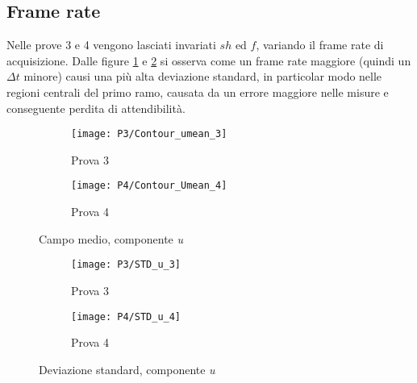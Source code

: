 \documentclass{article} %
\begin{document}
\subsection{Frame rate}
Nelle prove 3 e 4 vengono lasciati invariati $sh$ ed $f$, variando il frame rate di acquisizione. Dalle figure \ref{fig:cm_p3-1} e \ref{fig:cm_p4} si osserva come un frame rate maggiore (quindi un $\Delta t$ minore) causi una più alta deviazione standard, in particolar modo nelle regioni centrali del primo ramo, causata da un errore maggiore nelle misure e conseguente perdita di attendibilità.\par
\begin{figure}[ht!]
	\centering
	\begin{subfigure}{0.3\textwidth}
		\texttt{[image: P3/Contour\_umean\_3]}
		\caption{Prova 3}
		\label{fig:cm_p3-1}
	\end{subfigure} \quad
	\begin{subfigure}{0.3\textwidth}
		\texttt{[image: P4/Contour\_Umean\_4]}
		\caption{Prova 4}
		\label{fig:cm_p4}
	\end{subfigure}
	\caption{Campo medio, componente \textit{u}}
	\label{fig:cm_p34}
\end{figure}
\begin{figure}[!ht]
	\centering
	\begin{subfigure}{0.3\textwidth}
		\texttt{[image: P3/STD\_u\_3]}
		\caption{Prova 3}
		\label{fig:std_p3}	
	\end{subfigure} \quad
	\begin{subfigure}{0.3\textwidth}
		\texttt{[image: P4/STD\_u\_4]}
		\caption{Prova 4}
		\label{fig:std_p4}	
	\end{subfigure}	
	\caption{Deviazione standard, componente \textit{u}}
	\label{fig:std_p34}
\end{figure}
\end{document}
